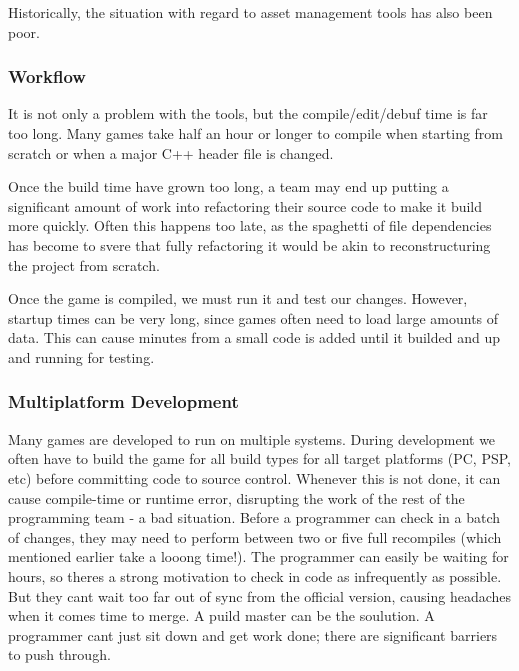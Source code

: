     Historically, the situation with regard to asset management tools has also been poor.

    \subsubsection*{Workflow}
    It is not only a problem with the tools, but the compile/edit/debuf time is far too long. Many games take half an hour or longer to compile when starting from scratch or when a major C++ header file is changed. 

    Once the build time have grown too long, a team may end up putting a significant amount of work into refactoring their source code to make it build more quickly. Often this happens too late, as the spaghetti of file dependencies has become to svere that fully refactoring it would be akin to reconstructuring the project from scratch. 

    Once the game is compiled, we must run it and test our changes. However, startup times can be very long, since games often need to load large amounts of data. This can cause minutes from a small code is added until it builded and up and running for testing. 


    \subsubsection*{Multiplatform Development}
    Many games are developed to run on multiple systems. During development we often have to build the game for all build types for all target platforms (PC, PSP, etc) before committing code to source control. Whenever this is not done, it can cause compile-time or runtime error, disrupting the work of the rest of the programming team - a bad situation. Before a programmer can check in a batch of changes, they may need to perform between two or five full recompiles (which mentioned earlier take a looong time!). The programmer can easily be waiting for hours, so theres a strong motivation to check in code as infrequently as possible. But they cant wait too far out of sync from the official version, causing headaches when it comes time to merge. A puild master can be the soulution. A programmer cant just sit down and get work done; there are significant barriers to push through.  

